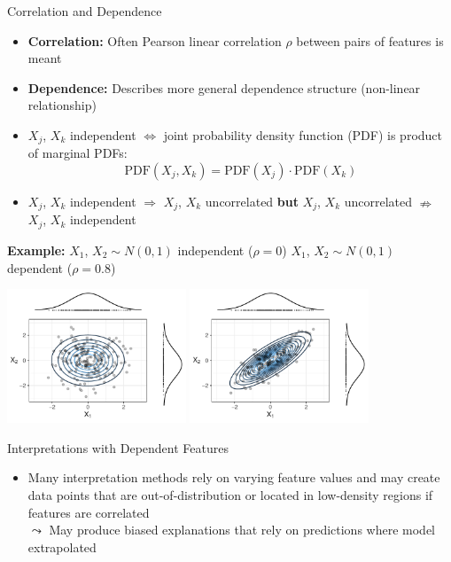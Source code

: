 \documentclass[11pt,compress,t,notes=noshow, aspectratio=169, xcolor=table]{beamer}
\begin{document}
\begin{frame}{Correlation and Dependence}
\begin{itemize}
\item \textbf{Correlation:} Often Pearson linear correlation $\rho$ between pairs of features is meant
\item \textbf{Dependence:} Describes more general dependence structure (non-linear relationship)
\item $X_j$, $X_k$ independent $\Leftrightarrow$ joint probability density function (PDF) is product of marginal PDFs:
$$\text{PDF}(X_j, X_k) = \text{PDF}(X_j) \cdot \text{PDF}(X_k)$$
\item $X_j$, $X_k$ independent $\Rightarrow$ $X_j$, $X_k$ uncorrelated \textbf{but} $X_j$, $X_k$ uncorrelated $\nRightarrow$ $X_j$, $X_k$  independent
\end{itemize}


\centering
\textbf{Example:} $X_1$, $X_2 \sim N(0,1)$ independent ($\rho = 0$) \hspace{10pt} $X_1$, $X_2 \sim N(0,1)$ dependent ($\rho = 0.8$) \hspace{30pt}

\includegraphics[width = 0.4\textwidth]{figure/independent}
\includegraphics[width = 0.4\textwidth]{figure/dependent}
\end{frame}

\begin{frame}{Interpretations with Dependent Features}
\begin{itemize}
\item Many interpretation methods rely on varying feature values and may create data points that are out-of-distribution or located in low-density regions if features are correlated\\
$\leadsto$ May produce biased explanations that rely on predictions where model extrapolated
\end{itemize}
\end{frame}
\end{document}
